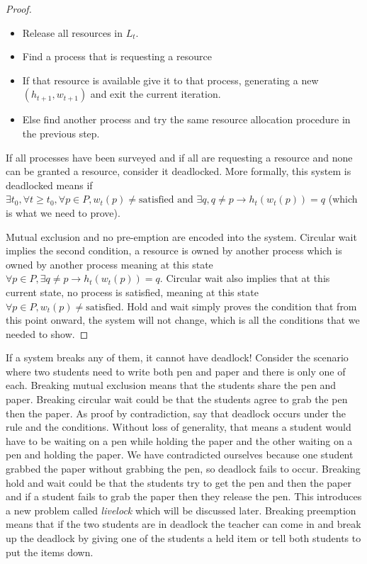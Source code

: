 \begin{proof}
\begin{itemize}
\item Release all resources in $L_t$.
\item Find a process that is requesting a resource
\item If that resource is available give it to that process, generating a new $(h_{t+1}, w_{t+1})$ and exit the current iteration.
\item Else find another process and try the same resource allocation procedure in the previous step.
\end{itemize}

If all processes have been surveyed and if all are requesting a resource and none can be granted a resource, consider it deadlocked.
More formally, this system is deadlocked means if $\exists t_0, \forall t \geq t_0, \forall p \in P, w_t(p) \neq \text{satisfied} \text{ and } \exists q, q \neq p \rightarrow h_t(w_t(p)) = q$ (which is what we need to prove).

Mutual exclusion and no pre-emption are encoded into the system.
Circular wait implies the second condition, a resource is owned by another process which is owned by another process meaning at this state $\forall p \in P, \exists q \neq p \rightarrow h_t(w_t(p)) = q$.
Circular wait also implies that at this current state, no process is satisfied, meaning at this state $\forall p \in P, w_t(p) \neq \text{satisfied}$.
Hold and wait simply proves the condition that from this point onward, the system will not change, which is all the conditions that we needed to show.
\end{proof}

If a system breaks any of them, it cannot have deadlock!
Consider the scenario where two students need to write both pen and paper and there is only one of each.
Breaking mutual exclusion means that the students share the pen and paper.
Breaking circular wait could be that the students agree to grab the pen then the paper.
As proof by contradiction, say that deadlock occurs under the rule and the conditions.
Without loss of generality, that means a student would have to be waiting on a pen while holding the paper and the other waiting on a pen and holding the paper.
We have contradicted ourselves because one student grabbed the paper without grabbing the pen, so deadlock fails to occur.
Breaking hold and wait could be that the students try to get the pen and then the paper and if a student fails to grab the paper then they release the pen.
This introduces a new problem called \textit{livelock} which will be discussed later.
Breaking preemption means that if the two students are in deadlock the teacher can come in and break up the deadlock by giving one of the students a held item or tell both students to put the items down.

